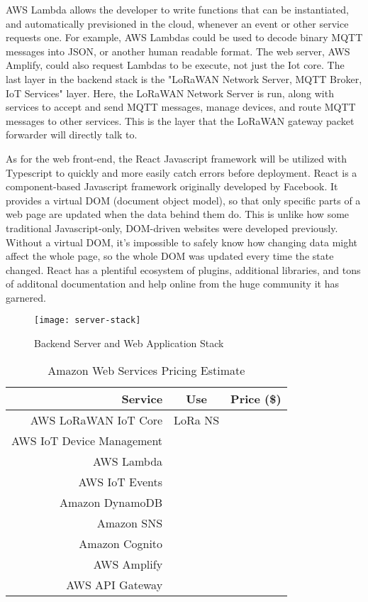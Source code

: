 AWS Lambda allows the developer to write functions that can be instantiated, and automatically
previsioned in the cloud, whenever an event or other service requests one. For example, AWS Lambdas
could be used to decode binary MQTT messages into JSON, or another human readable format. The web
server, AWS Amplify, could also request Lambdas to be execute, not just the Iot core. The last layer
in the backend stack is the "LoRaWAN Network Server, MQTT Broker, IoT Services" layer. Here, the
LoRaWAN Network Server is run, along with services to accept and send MQTT messages, manage devices,
and route MQTT messages to other services. This is the layer that the LoRaWAN gateway packet
forwarder will directly talk to.

As for the web front-end, the React Javascript framework will be utilized with Typescript to quickly
and more easily catch errors before deployment. React is a component-based Javascript framework
originally developed by Facebook. It provides a virtual DOM (document object model), so that only
specific parts of a web page are updated when the data behind them do. This is unlike how some
traditional Javascript-only, DOM-driven websites were developed previously. Without a virtual DOM,
it's impossible to safely know how changing data might affect the whole page, so the whole DOM was
updated every time the state changed. React has a plentiful ecosystem of plugins, additional
libraries, and tons of additonal documentation and help online from the huge community it has
garnered.


\begin{figure}
  \centering
  \texttt{[image: server-stack]}
  \caption{Backend Server and Web Application Stack}
  \label{server-stack}
\end{figure}

\begin{table}[H]
\centering\scriptsize
\caption{Amazon Web Services Pricing Estimate}
\begin{tabular}{|r|c|c|}
\hline
Service & Use & Price (\$)\\
\hline\hline

AWS LoRaWAN IoT Core & LoRa NS & \\\hline
AWS IoT Device Management & & \\\hline
AWS Lambda & & \\\hline
AWS IoT Events & & \\\hline
Amazon DynamoDB & & \\\hline
Amazon SNS & & \\\hline
Amazon Cognito & & \\\hline
AWS Amplify & & \\\hline
AWS API Gateway & & \\\hline

\end{tabular}
\label{lora-module-io}
\end{table}
